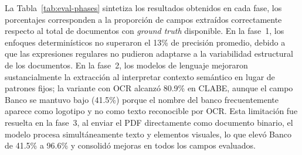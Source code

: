 La Tabla~\ref{tab:eval-phases} sintetiza los resultados obtenidos en cada fase, los porcentajes corresponden a la proporción de campos extraídos correctamente respecto al total de documentos con \textit{ground truth} disponible. En la fase~1, los enfoques determinísticos no superaron el 13\% de precisión promedio, debido a que las expresiones regulares no pudieron adaptarse a la variabilidad estructural de los documentos. En la fase~2, los modelos de lenguaje mejoraron sustancialmente la extracción al interpretar contexto semántico en lugar de patrones fijos; la variante con OCR alcanzó 80.9\% en CLABE, aunque el campo Banco se mantuvo bajo (41.5\%) porque el nombre del banco frecuentemente aparece como logotipo y no como texto reconocible por OCR. Esta limitación fue resuelta en la fase~3, al enviar el PDF directamente como documento binario, el modelo procesa simultáneamente texto y elementos visuales, lo que elevó Banco de 41.5\% a 96.6\% y consolidó mejoras en todos los campos evaluados.

\begin{table}[H]
\centering
\vspace{6pt}
\caption{Resultados por fase de evaluación}
\label{tab:eval-phases}
\end{table}




